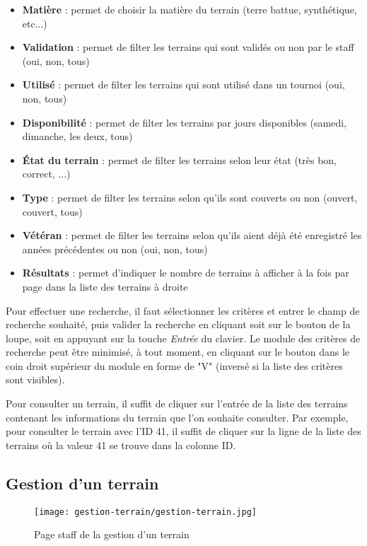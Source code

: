 \begin{itemize}
\item \textbf{Matière} : permet de choisir la matière du terrain (terre battue, synthétique, etc...)
\item \textbf{Validation} : permet de filter les terrains qui sont validés ou non par le staff (oui, non, tous)
\item \textbf{Utilisé} : permet de filter les terrains qui sont utilisé dans un tournoi (oui, non, tous)
\item \textbf{Disponibilité} : permet de filter les terrains par jours disponibles (samedi, dimanche, les deux, tous)
\item \textbf{État du terrain} : permet de filter les terrains selon leur état (très bon, correct, ...)
\item \textbf{Type }: permet de filter les terrains selon qu'ils sont couverts ou non (ouvert, couvert, tous)
\item \textbf{Vétéran} : permet de filter les terrains selon qu'ils aient déjà été enregistré les années précédentes ou non (oui, non, tous)
\item \textbf{Résultats} : permet d'indiquer le nombre de terrains à afficher à la fois par page dans la liste des terrains à droite
\end{itemize}
\bigskip

Pour effectuer une recherche, il faut sélectionner les critères et entrer le champ de recherche souhaité, puis valider la recherche en cliquant soit sur le bouton de la loupe, soit en appuyant sur la touche \textit{Entrée} du clavier. Le module des critères de recherche peut être minimisé, à tout moment, en cliquant sur le bouton dans le coin droit supérieur du module en forme de "V" (inversé si la liste des critères sont visibles).\newline

Pour consulter un terrain, il suffit de cliquer sur l'entrée de la liste des terrains contenant les informations du terrain que l'on souhaite consulter. Par exemple, pour consulter le terrain avec l'ID 41, il suffit de cliquer sur la ligne de la liste des terrains où la valeur 41 se trouve dans la colonne ID.

\subsection{Gestion d'un terrain}

\begin{figure}[H]
\centering
\texttt{[image: gestion-terrain/gestion-terrain.jpg]}
\caption{Page staff de la gestion d'un terrain}
\end{figure}

